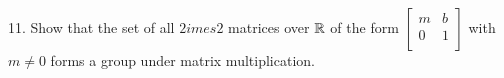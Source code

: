 \begin{mdframed}[style=darkAnswer,frametitle={Joe Starr}]
\begin{itemize}[align=left]
{    }
        
  \end{itemize}
\end{mdframed}
\newpage
\begin{mdframed}[style=darkQuesion]
  11. Show that the set of all $2  imes 2$ matrices over $\mathbb{R}$ of the form
  $\begin{bmatrix}
    m & b \\
    0 & 1 \\
  \end{bmatrix}$ with $m\neq 0$ forms a group under matrix multiplication.
\end{mdframed}

